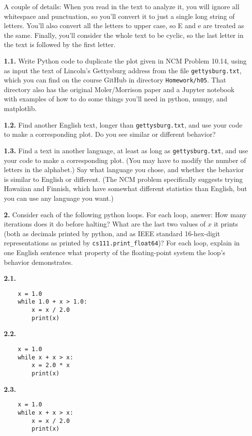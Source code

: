 \documentclass[11pt]{article}
\begin{document}
A couple of details:
When you read in the text to analyze it, you will ignore all whitespace and punctuation,
so you'll convert it to just a single long string of letters.
You'll also convert all the letters to upper case, so E and e are treated as the same.
Finally, you'll consider the whole text to be cyclic, so the last letter in the text is
followed by the first letter.

\par\medskip
{\bf 1.1.}
Write Python code to duplicate the plot given in NCM Problem 10.14, 
using as input the text of Lincoln's Gettysburg address from the file 
{\tt gettysburg.txt}, which you can find on the course GitHub
in directory {\tt Homework/h05}.
That directory also has the original Moler/Morrison paper and
a Jupyter notebook with examples of how to do some things you'll need in 
python, numpy, and matplotlib.

\par\medskip
{\bf 1.2.}
Find another English text, longer than {\tt gettysburg.txt},
and use your code to make a corresponding plot.
Do you see similar or different behavior?

\par\medskip
{\bf 1.3.}
Find a text in another language, at least as long as {\tt gettysburg.txt},
and use your code to make a corresponding plot.
(You may have to modify the number of letters in the alphabet.)
Say what language you chose, and whether the behavior is similar to English or different.
(The NCM problem specifically suggests trying Hawaiian and Finnish, 
which have somewhat different statistics than English,
but you can use any language you want.)

\par\bigskip
{\bf 2.}
Consider each of the following python loops.
For each loop, answer:
How many iterations does it do before halting?
What are the last two values of $x$ it prints
(both as decimals printed by python, and as
IEEE standard 16-hex-digit representations
as printed by {\tt cs111.print\_float64})?
For each loop, explain in one English
sentence what property of the floating-point system 
the loop's behavior demonstrates.

\par\medskip
{\bf 2.1.}
\begin{verbatim}
    x = 1.0
    while 1.0 + x > 1.0:
        x = x / 2.0
        print(x)
\end{verbatim}

\par\medskip
{\bf 2.2.}
\begin{verbatim}
    x = 1.0
    while x + x > x:
        x = 2.0 * x
        print(x)
\end{verbatim}

\par\medskip
{\bf 2.3.}
\begin{verbatim}
    x = 1.0
    while x + x > x:
        x = x / 2.0
        print(x)
\end{verbatim}
        
\end{document}
